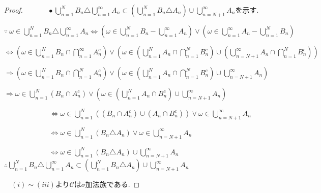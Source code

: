 \documentclass{jsarticle}
\begin{document}
\begin{proof}
$\quad \qquad$ $\bullet \ \displaystyle\bigcup_{n=1}^{N} B_{n} \triangle \displaystyle\bigcup_{n=1}^{\infty} A_{n} \subset (\displaystyle\bigcup_{n=1}^{N} B_{n} \triangle A_{n}) \cup \displaystyle\bigcup_{n=N+1}^{\infty} A_{n}$を示す. \par
$\quad \qquad$ $\because \ \omega \in \displaystyle\bigcup_{n=1}^{N} B_{n} \triangle \displaystyle\bigcup_{n=1}^{\infty} A_{n} \Leftrightarrow (\omega \in \displaystyle\bigcup_{n=1}^{N} B_{n} - \displaystyle\bigcup_{n=1}^{\infty} A_{n}) \lor  (\omega \in \displaystyle\bigcup_{n=1}^{\infty} A_{n} - \displaystyle\bigcup_{n=1}^{N} B_{n})$ \par 
$\qquad \qquad \qquad$
$ \Leftrightarrow (\omega \in \displaystyle\bigcup_{n=1}^{N} B_{n} \cap \displaystyle\bigcap_{n=1}^{\infty} A_{n}^{c}) \lor 
 (\omega \in ( \displaystyle\bigcup_{n=1}^{N} A_{n} \cap \displaystyle\bigcap_{n=1}^{N} B_{n}^{c}) \cup (\displaystyle\bigcup_{n=N+1}^{\infty} A_{n} \cap \displaystyle\bigcap_{n=1}^{N} B_{n}^{c}) ) $\par 
$\qquad \qquad \qquad$
$\Rightarrow (\omega \in \displaystyle\bigcup_{n=1}^{N} B_{n} \cap \displaystyle\bigcap_{n=1}^{N} A_{n}^{c}) \lor (\omega \in ( \displaystyle\bigcup_{n=1}^{N} A_{n} \cap \displaystyle\bigcap_{n=1}^{N} B_{n}^{c}) \cup \displaystyle\bigcup_{n=N+1}^{\infty} A_{n} )$\par 
$\qquad \qquad \qquad$
$\Rightarrow \omega \in \displaystyle\bigcup_{n=1}^{N} (B_{n} \cap  A_{n}^{c}) \lor (\omega \in ( \displaystyle\bigcup_{n=1}^{N} A_{n} \cap B_{n}^{c}) \cup \displaystyle\bigcup_{n=N+1}^{\infty} A_{n} )$
\par 
$\qquad \qquad \qquad$
$\Leftrightarrow \omega \in \displaystyle\bigcup_{n=1}^{N} ( (B_{n} \cap  A_{n}^{c}) \cup (A_{n} \cap  B_{n}^{c}) ) \lor \omega \in \displaystyle\bigcup_{n=N+1}^{\infty} A_{n}$
\par 
$\qquad \qquad \qquad$
$\Leftrightarrow  \omega \in \displaystyle\bigcup_{n=1}^{N} ( B_{n} \triangle A_{n}) \lor \omega \in \displaystyle\bigcup_{n=N+1}^{\infty} A_{n}$
\par 
$\qquad \qquad \qquad$
$\Leftrightarrow \omega \in \displaystyle\bigcup_{n=1}^{N} ( B_{n} \triangle A_{n}) \cup \displaystyle\bigcup_{n=N+1}^{\infty} A_{n}$
$\qquad \quad$ $\therefore \displaystyle\bigcup_{n=1}^{N} B_{n} \triangle \displaystyle\bigcup_{n=1}^{\infty} A_{n} \subset (\displaystyle\bigcup_{n=1}^{N} B_{n} \triangle A_{n}) \cup \displaystyle\bigcup_{n=N+1}^{\infty} A_{n}$ \par
$\quad$$(i) \sim (iii)$より$\mathcal{C}$は$\sigma$加法族である.



\end{proof}
\end{document}
